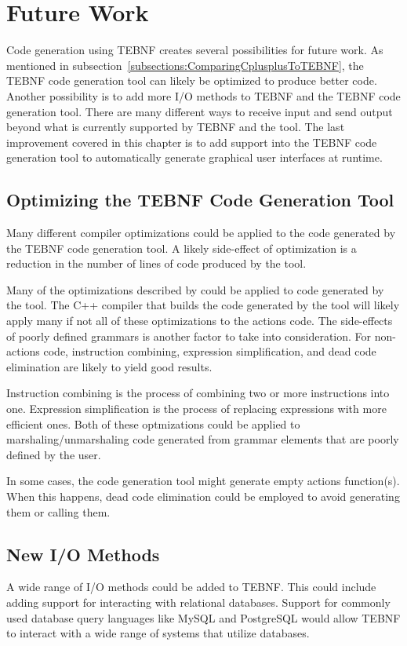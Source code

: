 \chapter{Future Work}
Code generation using TEBNF creates several possibilities for future work.  As mentioned in subsection~\ref{subsections:ComparingCplusplusToTEBNF}, the TEBNF code generation tool can likely be optimized to produce better code.  Another possibility is to add more I/O methods to TEBNF and the TEBNF code generation tool.  There are many different ways to receive input and send output beyond what is currently supported by TEBNF and the tool.  The last improvement covered in this chapter is to add support into the TEBNF code generation tool to automatically generate graphical user interfaces at runtime.

\section{Optimizing the TEBNF Code Generation Tool}
Many different compiler optimizations could be applied to the code generated by the TEBNF code generation tool.  A likely side-effect of optimization is a reduction in the number of lines of code produced by the tool.

\indent
Many of the optimizations described by \cite{optimizations_01} could be applied to code generated by the tool.  The C++ compiler that builds the code generated by the tool will likely apply many if not all of these optimizations to the actions code.   The side-effects of poorly defined grammars is another factor to take into consideration.  For non-actions code, instruction combining, expression simplification, and dead code elimination are likely to yield good results.

\indent
Instruction combining is the process of combining two or more instructions into one.  Expression simplification is the process of replacing expressions with more efficient ones.  Both of these optmizations could be applied to marshaling/unmarshaling code generated from grammar elements that are poorly defined by the user.

\indent
In some cases, the code generation tool might generate empty actions function(s).
When this happens, dead code elimination could be employed to avoid generating them or calling them.

\section{New I/O Methods}
A wide range of I/O methods could be added to TEBNF.  This could include adding support for interacting with relational databases.  Support for commonly used database query languages like MySQL and PostgreSQL would allow TEBNF to interact with a wide range of systems that utilize databases.

